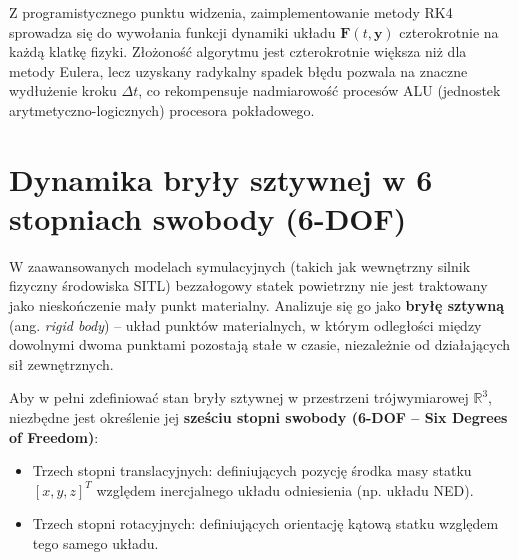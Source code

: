 Z programistycznego punktu widzenia, zaimplementowanie metody RK4 sprowadza się do wywołania funkcji dynamiki układu $\mathbf{F}(t, \mathbf{y})$ czterokrotnie na każdą klatkę fizyki. Złożoność algorytmu jest czterokrotnie większa niż dla metody Eulera, lecz uzyskany radykalny spadek błędu pozwala na znaczne wydłużenie kroku $\Delta t$, co rekompensuje nadmiarowość procesów ALU (jednostek arytmetyczno-logicznych) procesora pokładowego.


\section{Dynamika bryły sztywnej w 6 stopniach swobody (6-DOF)}

W zaawansowanych modelach symulacyjnych (takich jak wewnętrzny silnik fizyczny środowiska SITL) bezzałogowy statek powietrzny nie jest traktowany jako nieskończenie mały punkt materialny. Analizuje się go jako \textbf{bryłę sztywną} (ang. \textit{rigid body}) – układ punktów materialnych, w którym odległości między dowolnymi dwoma punktami pozostają stałe w czasie, niezależnie od działających sił zewnętrznych.

Aby w pełni zdefiniować stan bryły sztywnej w przestrzeni trójwymiarowej $\mathbb{R}^3$, niezbędne jest określenie jej \textbf{sześciu stopni swobody (6-DOF -- Six Degrees of Freedom)}:
\begin{itemize}
    \item Trzech stopni translacyjnych: definiujących pozycję środka masy statku $[x, y, z]^T$ względem inercjalnego układu odniesienia (np. układu NED).
    \item Trzech stopni rotacyjnych: definiujących orientację kątową statku względem tego samego układu.
\end{itemize}

